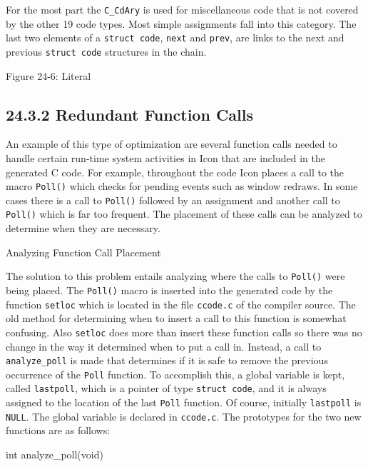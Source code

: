 For the most part the \texttt{C\_CdAry} is used for miscellaneous code
that is not covered by the other 19 code types. Most simple
assignments fall into this category. The last two elements of a
\texttt{struct code}, \texttt{next} and \texttt{prev}, are links to
the next and previous \texttt{struct code} structures in the chain.


\bigskip


\bigskip

{\centering{}
Figure 24-6: Literal
\par}

\subsection[24.3.2 Redundant Function Calls]{24.3.2 Redundant Function Calls}

An example of this type of optimization are several function calls
needed to handle certain run-time system activities in Icon that are
included in the generated C code. For example, throughout the code
Icon places a call to the macro \texttt{Poll()} which checks for
pending events such as window redraws. In some cases there is a call
to \texttt{Poll()} followed by an assignment and another call to
\texttt{Poll()} which is far too frequent. The placement of these
calls can be analyzed to determine when they are necessary.

{\sffamily
Analyzing Function Call Placement}

The solution to this problem entails analyzing where the calls to
\texttt{Poll()} were being placed. The \texttt{Poll()} macro is
inserted into the generated code by the function \texttt{setloc} which
is located in the file \texttt{ccode.c} of the compiler source. The
old method for determining when to insert a call to this function is
somewhat confusing. Also \texttt{setloc} does more than insert these
function calls so there was no change in the way it determined when to
put a call in. Instead, a call to \texttt{analyze\_poll} is made that
determines if it is safe to remove the previous occurrence of the
\texttt{Poll} function. To accomplish this, a global variable is kept,
called \texttt{lastpoll}, which is a pointer of type \texttt{struct
code}, and it is always assigned to the location of the last
\texttt{Poll} function. Of course, initially \texttt{lastpoll} is
\texttt{NULL}. The global variable is declared in
\texttt{ccode.c}. The prototypes for the two new functions are as
follows:

{\ttfamily\mdseries
int analyze\_poll(void)}


